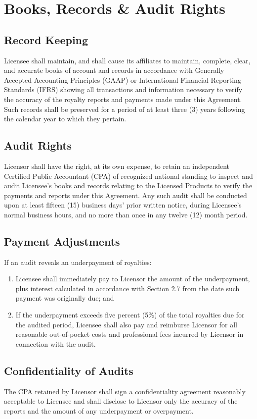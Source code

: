 \section{Books, Records \& Audit Rights}

\subsection{Record Keeping} Licensee shall maintain, and shall cause its affiliates to maintain, complete, clear, and accurate books of account and records in accordance with Generally Accepted Accounting Principles (GAAP) or International Financial Reporting Standards (IFRS) showing all transactions and information necessary to verify the accuracy of the royalty reports and payments made under this Agreement. Such records shall be preserved for a period of at least three (3) years following the calendar year to which they pertain.

\subsection{Audit Rights} Licensor shall have the right, at its own expense, to retain an independent Certified Public Accountant (CPA) of recognized national standing to inspect and audit Licensee's books and records relating to the Licensed Products to verify the payments and reports under this Agreement. Any such audit shall be conducted upon at least fifteen (15) business days' prior written notice, during Licensee's normal business hours, and no more than once in any twelve (12) month period.

\subsection{Payment Adjustments} If an audit reveals an underpayment of royalties:
\begin{enumerate}
  \item Licensee shall immediately pay to Licensor the amount of the underpayment, plus interest calculated in accordance with Section 2.7 from the date such payment was originally due; and
  \item If the underpayment exceeds five percent (5\%) of the total royalties due for the audited period, Licensee shall also pay and reimburse Licensor for all reasonable out-of-pocket costs and professional fees incurred by Licensor in connection with the audit.
\end{enumerate}

\subsection{Confidentiality of Audits} The CPA retained by Licensor shall sign a confidentiality agreement reasonably acceptable to Licensee and shall disclose to Licensor only the accuracy of the reports and the amount of any underpayment or overpayment.
